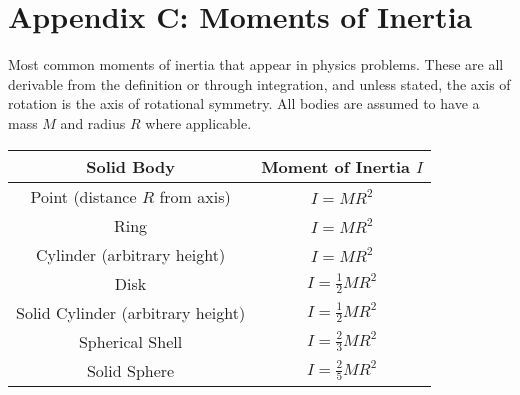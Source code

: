 \section*{Appendix C: Moments of Inertia}
Most common moments of inertia that appear in physics problems. These are all derivable from the definition or through integration, and unless stated, the axis of rotation is the axis of rotational symmetry. All bodies are assumed to have a mass $M$ and radius $R$ where applicable. 
\begin{center}
	\begin{tabular}{c c}
		Solid Body & Moment of Inertia $I$\\ \hline \hline \noalign{\smallskip}
		Point (distance $R$ from axis) & $I = MR^2$\\[3pt]  \hline \noalign{\smallskip}
		Ring & $I = MR^2$\\[3pt]  \hline \noalign{\smallskip}
		Cylinder (arbitrary height) & $I = MR^2$\\ [3pt] \hline \noalign{\smallskip}
		Disk & $I = \frac{1}{2}MR^2$ \\[3pt]  \hline \noalign{\smallskip}
		Solid Cylinder (arbitrary height) &  $I = \frac{1}{2}MR^2$ \\[3pt]  \hline \noalign{\smallskip}
		Spherical Shell & $I = \frac{2}{3}MR^2$ \\[3pt]  \hline \noalign{\smallskip}
		Solid Sphere & $I = \frac{2}{5}MR^2$ \\[3pt] \hline \hline
	\end{tabular}
\end{center}